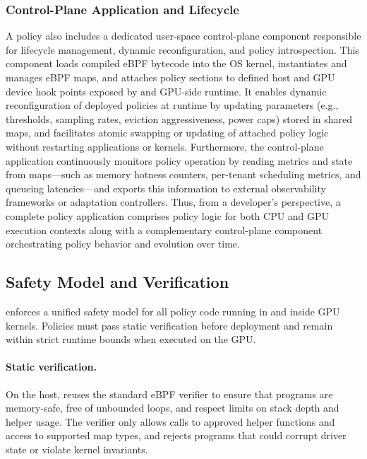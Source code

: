 \subsubsection{Control-Plane Application and Lifecycle}

A \sys policy also includes a dedicated user-space control-plane component responsible for lifecycle management, dynamic reconfiguration, and policy introspection. This component loads compiled eBPF bytecode into the OS kernel, instantiates and manages eBPF maps, and attaches policy sections to defined host and GPU device hook points exposed by \sysdriver and GPU-side runtime. It enables dynamic reconfiguration of deployed policies at runtime by updating parameters (e.g., thresholds, sampling rates, eviction aggressiveness, power caps) stored in shared maps, and facilitates atomic swapping or updating of attached policy logic without restarting applications or kernels. Furthermore, the control-plane application continuously monitors policy operation by reading metrics and state from maps—such as memory hotness counters, per-tenant scheduling metrics, and queueing latencies—and exports this information to external observability frameworks or adaptation controllers. Thus, from a developer’s perspective, a complete \sys policy application comprises policy logic for both CPU and GPU execution contexts along with a complementary control-plane component orchestrating policy behavior and evolution over time.

\subsection{Safety Model and Verification}
\label{sec:safety}

\sys enforces a unified safety model for all policy code running in \sysdriver and
inside GPU kernels. Policies must pass static verification before deployment and
remain within strict runtime bounds when executed on the GPU.

\paragraph{Static verification.}
On the host, \sys reuses the standard eBPF verifier to ensure that programs are
memory-safe, free of unbounded loops, and respect limits on stack depth and helper
usage. The verifier only allows calls to approved helper functions and access to
supported map types, and rejects programs that could corrupt driver state or violate
kernel invariants.


